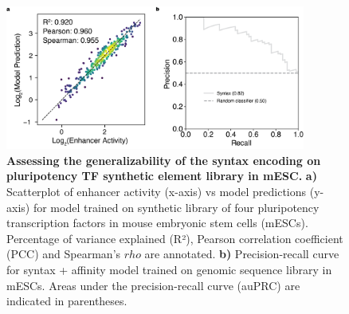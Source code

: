 \begin{figure}[p]
    \centering
    \includegraphics[width=0.88\textwidth]{2_figures-and-files/SuppFig16.png}
    \caption[Assessing the generalizability of the syntax encoding on pluripotency TF synthetic element library in mESC.]{\textbf{Assessing the generalizability of the syntax encoding on pluripotency TF synthetic element library in mESC.} \textbf{a)} Scatterplot of enhancer activity (x-axis) vs model predictions (y-axis) for model trained on synthetic library of four pluripotency transcription factors in mouse embryonic stem cells (mESCs). Percentage of variance explained (R²), Pearson correlation coefficient (PCC) and Spearman’s $rho$ are annotated. \textbf{b)} Precision-recall curve for syntax + affinity model trained on genomic sequence library in mESCs. Areas under the precision-recall curve (auPRC) are indicated in parentheses.}
    \label{fig:2 supplementary_16}
\end{figure}
